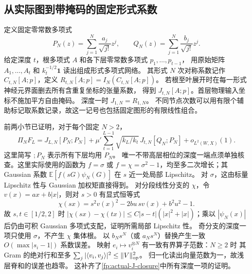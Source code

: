 \documentclass[a4paper]{tufte-handout}
\begin{document}
\begin{fullwidth}
\subsection{从实际图到带掩码的固定形式系数}
\label{fp:actual-masked-formula}
定义固定零常数多项式
\begin{equation}\label{fp:actual-PQ}
 P_N(z)=\sum_{j=1}^N\frac{a_j}{\sqrt{j!}}z^j,
 \qquad Q_N(z)=\sum_{j=1}^N\frac{b_j}{\sqrt{j!}}z^j.
\end{equation}
给定深度 $t$，根多项式 $A$ 和各下层零常数多项式 $p_1,\ldots,p_{t-1}$，
用原始矩阵 $A_1,\ldots,A_t$ 和 $k_t^{-1/2}\mathbf1$ 读出组成形式多项式网络。
其形式 $N$ 次对称系数记作 $C_{t,N}[A;p]$，定义
$R_{t,N}[A;p]=I_N(C_{t,N}[A;p])$。
若根至叶展开时在每一形式神经元界面删去所有含重复坐标的张量系数，
得到 $J_{t,N}[A;p]$。首层物理输入坐标不施加平方自由掩码。
深度一时 $J_{1,N}=R_{1,N}$。
不同节点次数可以用有限个辅助标记取系数记录，故这一记号也包括固定图形的有限线性组合。

前两小节已证明，对于每个固定 $N>2$，
\begin{equation}\label{fp:actual-J-closure}
 \Pi_N F_L=J_{L,N}[P_N;P_N]
 +\mu'\sum_{t=1}^{L-1}\sqrt{k_L/k_t}\,J_{t,N}[Q_N;P_N]
 +o_{L^2(W,X)}(1).
\end{equation}
这里简写 $;P_N$ 表示所有下层均用 $P_N$。
唯一不带高层相位的深度一端点须单独核查。这里实际使用的函数为
$f=\sigma$ 或 $f=\chi=\sigma^2-1$，均至多二次增长；其 Gaussian 系数
$\mathbb E[f(sG)\psi_N(G)]$ 在 $s$ 近一处局部 Lipschitz。
对 $\sigma$，这由标量 Lipschitz 性与 Gaussian 加权矩直接得到。
对分段线性分支的 $\chi$，令 $v(x)=ax+b|x|$，则对 $s>0$ 有显式恒等式
\[
 \chi(sx)=s^2v(x)^2-2bu\,s v(x)+b^2u^2-1.
\]
故 $s,t\in[1/2,2]$ 时
$|\chi(sx)-\chi(tx)|\leq C|s-t|(|x|^2+|x|)$；乘以
$|\psi_N(x)|$ 后仍由可积 Gaussian 多项式支配，证明所需局部 Lipschitz 性。
奇分支的深度一项只使用 $\sigma$，不产生 $\chi$ 集体根。
以 $b_Ns^N$（或 $a_Ns^N$）替换产生一致 $O(\max|s_i-1|)$ 系数误差。
映射 $e_i\mapsto v_i^{\otimes N}$ 有一致有界算子范数：$N\geq2$ 时
其 Gram 的绝对行和至多 $\sum_j|\langle v_i,v_j\rangle|^2\leq\|V\|_{\rm op}^2$。
归一化读出向量范数为一，故浅层脊和的误差也趋零。
这补齐了\eqref{fp:actual-J-closure}中所有深度一项的证明。


\end{fullwidth}
\end{document}
